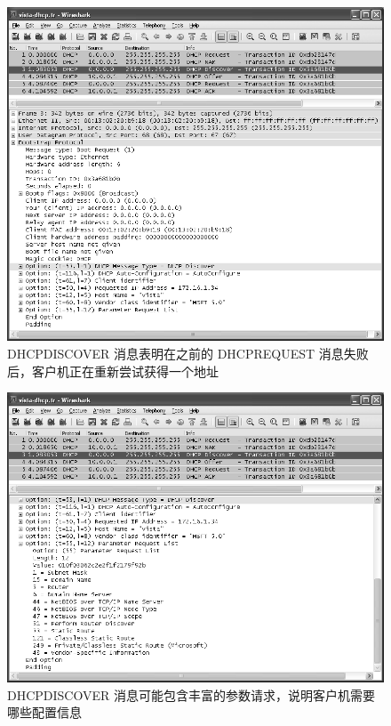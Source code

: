 \begin{figure}[H]
    \centering
	\includegraphics[scale=0.5]{imgs/6/6-5.png}
	\caption{DHCPDISCOVER 消息表明在之前的 DHCPREQUEST 消息失败后，客户机正在重新尝试获得一个地址}
\end{figure}

\begin{figure}[H]
    \centering
	\includegraphics[scale=0.5]{imgs/6/6-6.png}
	\caption{DHCPDISCOVER 消息可能包含丰富的参数请求，说明客户机需要哪些配置信息}
\end{figure}

